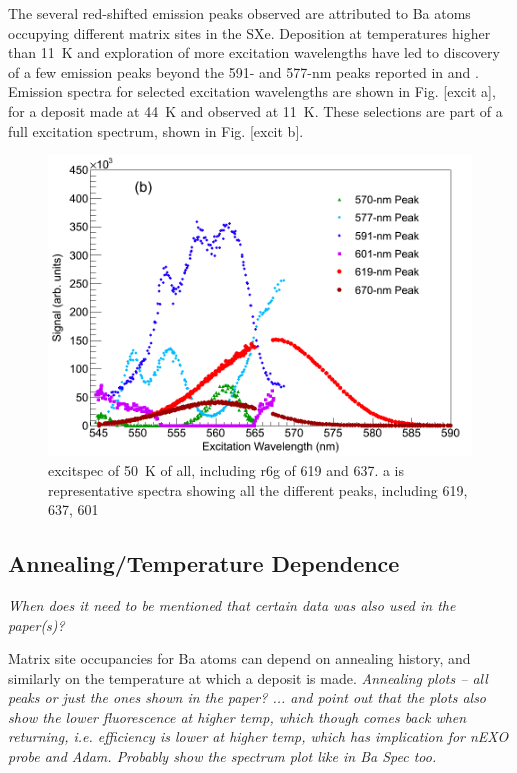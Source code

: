 The several red-shifted emission peaks observed are attributed to Ba atoms occupying different matrix sites in the SXe.  Deposition at temperatures higher than 11~K and exploration of more excitation wavelengths have led to discovery of a few emission peaks beyond the 591- and 577-nm peaks reported in \cite{Shon} and \cite{Brian}.  Emission spectra for selected excitation wavelengths are shown in Fig. [excit a], for a deposit made at 44~K and observed at 11~K.  These selections are part of a full excitation spectrum, shown in Fig. [excit b].

\begin{figure} %
        \centering
                \includegraphics[width=.7\textwidth]{figures/excitspec_grn.png}
                \caption{\color{red}excitspec of 50~K of all, including r6g of 619 and 637. a is representative spectra showing all the different peaks, including 619, 637, 601}
\label{fig:excitspecGrn}
\end{figure}

\subsection{Annealing/Temperature Dependence}
\label{subsec:tempanneal}

\emph{\color{gray}When does it need to be mentioned that certain data was also used in the paper(s)?}

Matrix site occupancies for Ba atoms can depend on annealing history, and similarly on the temperature at which a deposit is made.  \emph{\color{gray}Annealing plots -- all peaks or just the ones shown in the paper? ... and point out that the plots also show the lower fluorescence at higher temp, which though comes back when returning, i.e. efficiency is lower at higher temp, which has implication for nEXO probe and Adam.  Probably show the spectrum plot like in Ba Spec too.}

